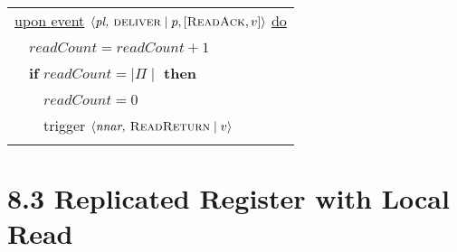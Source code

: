 \documentclass{article}
\begin{document}
\begin{center}
\begin{tabular}{l}
			\\
			\underline{upon event} $\langle \textit{pl, } \textsc{deliver} \mid p, [\textsc{ReadAck},v] \rangle$ \underline{do} \\
			\ \ $\textit{readCount} = \textit{readCount} + 1$ \\
			\ \ \textbf{if} $\textit{readCount} = \mid \Pi \mid$ \textbf{then} \\
			\ \ \ \ $\textit{readCount} = 0$ \\
			\ \ \ \ trigger $\langle \textit{nnar, } \textsc{ReadReturn} \mid v \rangle$ \\
			\\
		\end{tabular}
	\end{center}
	
	\section*{8.3 Replicated Register with Local Read}
	\begin{adjustwidth}{2em}{2em}
	\end{adjustwidth}
\end{document}
